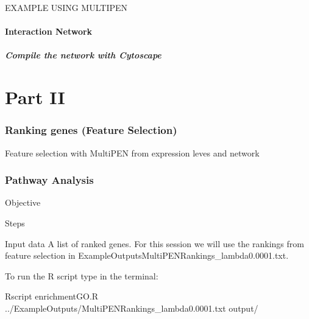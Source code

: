 \documentclass[11pt, oneside]{article}   	%
\begin{document}
EXAMPLE USING MULTIPEN


\subsection{Interaction Network}
\subsubsection{Compile the network with Cytoscape}


\part{Part II}
\section{Ranking genes (Feature Selection)} 

Feature selection with MultiPEN from expression leves and network 


\section{Pathway Analysis}

Objective

Steps

Input data
A list of ranked genes. For this session we will use the rankings from feature selection in ExampleOutputs\/MultiPEN\-Rankings\_lambda0.0001.txt.

To run the R script type in the terminal:

Rscript enrichmentGO.R ../ExampleOutputs/MultiPEN\-Rankings\_lambda0.0001.txt output/




%	




\end{document}
